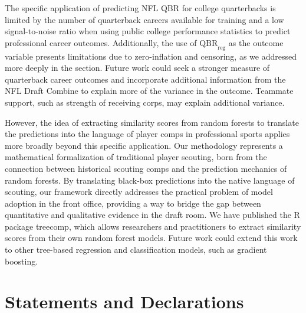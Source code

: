 \documentclass[Review, sageh, times, doublespace]{sagej}
\newcommand{\revision}[1]{{\color{orange} #1}}
\begin{document}
  The specific application of predicting NFL QBR for college quarterbacks is limited by the number of quarterback careers available for training and a low signal-to-noise ratio when using public college performance statistics to predict professional career outcomes. Additionally, the use of $\text{QBR}_\text{reg}$ as the outcome variable presents limitations due to zero-inflation and censoring, as we addressed more deeply in the  section. Future work could seek a stronger measure of quarterback career outcomes and incorporate additional information from the NFL Draft Combine to explain more of the variance in the outcome. Teammate support, such as strength of receiving corps, may explain additional variance.

  However, the idea of extracting similarity scores from random forests to translate the predictions into the language of player comps in professional sports applies more broadly beyond this specific application. \revision{Our methodology represents a mathematical formalization of traditional player scouting, born from the connection between historical scouting comps and the prediction mechanics of random forests. By translating black-box predictions into the native language of scouting, our framework directly addresses the practical problem of model adoption in the front office, providing a way to bridge the gap between quantitative and qualitative evidence in the draft room.} We have published the R package treecomp, which allows researchers and practitioners to extract similarity scores from their own random forest models. Future work could extend this work to other tree-based regression and classification models, such as gradient boosting.

%
%
%


\section{Statements and Declarations}
\end{document}
